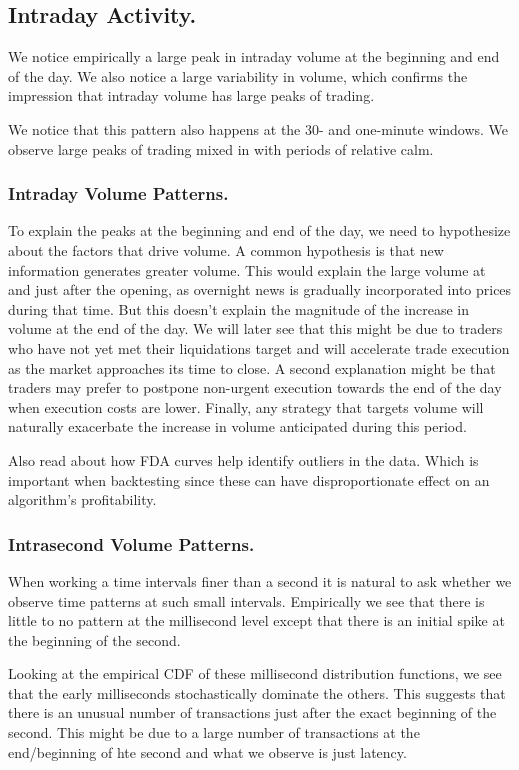 \documentclass[11pt,a4paper]{article}
\theoremstyle{definition}
\theoremstyle{plain}
\theoremstyle{remark}
\newcommand{\1}{\mathbbm{1}}
\begin{document}
\subsection{Intraday Activity.} 
We notice empirically a large peak in intraday volume at the beginning and end of the day. We also notice a large variability 
in volume, which confirms the impression that intraday volume has large peaks of trading. 

We notice that this pattern also happens at the $30$- and one-minute windows. We observe large peaks of trading mixed in with periods of 
relative calm. 

\subsubsection{Intraday Volume Patterns.} 
To explain the peaks at the beginning and end of the day, we need to hypothesize about the factors that drive volume. 
A common hypothesis is that new information generates greater volume.  This would explain the large volume at and just after the opening, as overnight news 
is gradually incorporated into prices during that time. But this doesn't explain the magnitude of the increase in volume at the end of the day. 
We will later see that this might be due to traders who have not yet met their liquidations target and will accelerate trade execution as the 
market approaches its time to close. A second explanation might be that traders may prefer to postpone non-urgent execution towards the end of the day when 
execution costs are lower. Finally, any strategy that targets volume will naturally exacerbate the increase in volume anticipated during this period. 

Also read about how FDA curves help identify outliers in the data. Which is important when backtesting since these can have disproportionate effect on 
an algorithm's profitability.  

\subsubsection{Intrasecond Volume Patterns.} 
When working a time intervals finer than a second it is natural to ask whether we observe time patterns at such small intervals. 
Empirically we see that there is little to no pattern at the millisecond level except that there is an initial spike at the beginning
of the second. 

Looking at the empirical CDF of these millisecond distribution functions, we see that the early milliseconds stochastically dominate the others. 
This suggests that there is an unusual number of transactions just after the exact beginning of the second. This might be due to a large number of 
transactions at the end/beginning of hte second and what we observe is just latency. 
\end{document}
